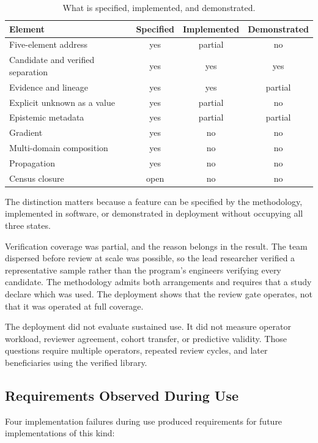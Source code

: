 \documentclass[conference]{IEEEtran}
\begin{document}
\begin{table}[!t]
\caption{What is specified, implemented, and demonstrated.}
\label{tab:status}
\centering
\scriptsize
\begin{tabularx}{\columnwidth}{Xccc}
\hline
\textbf{Element} & \textbf{Specified} & \textbf{Implemented} & \textbf{Demonstrated} \\
\hline
Five-element address & yes & partial & no \\
Candidate and verified separation & yes & yes & yes \\
Evidence and lineage & yes & yes & partial \\
Explicit unknown as a value & yes & partial & no \\
Epistemic metadata & yes & partial & partial \\
Gradient & yes & no & no \\
Multi-domain composition & yes & no & no \\
Propagation & yes & no & no \\
Census closure & open & no & no \\
\hline
\end{tabularx}
\end{table}

The distinction matters because a feature can be specified by the methodology, implemented in software, or demonstrated in deployment without occupying all three states.

Verification coverage was partial, and the reason belongs in the result. The team dispersed before review at scale was possible, so the lead researcher verified a representative sample rather than the program's engineers verifying every candidate. The methodology admits both arrangements and requires that a study declare which was used. The deployment shows that the review gate operates, not that it was operated at full coverage.

The deployment did not evaluate sustained use. It did not measure operator workload, reviewer agreement, cohort transfer, or predictive validity. Those questions require multiple operators, repeated review cycles, and later beneficiaries using the verified library.

\subsection{Requirements Observed During Use}\label{sec:7-4}

Four implementation failures during use produced requirements for future implementations of this kind:
\end{document}
